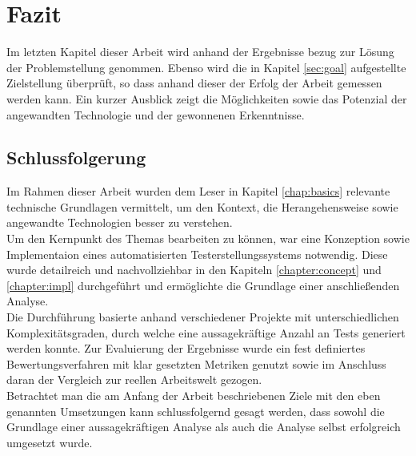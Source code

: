 \chapter{Fazit}
Im letzten Kapitel dieser Arbeit wird anhand der Ergebnisse bezug zur Lösung der Problemstellung genommen. Ebenso wird die in Kapitel \ref{sec:goal} aufgestellte Zielstellung überprüft, so dass anhand dieser der Erfolg der Arbeit gemessen werden kann. Ein kurzer Ausblick zeigt die Möglichkeiten sowie das Potenzial der angewandten Technologie und der gewonnenen Erkenntnisse.

\section{Schlussfolgerung}
Im Rahmen dieser Arbeit wurden dem Leser in Kapitel \ref{chap:basics} relevante technische Grundlagen vermittelt, um den Kontext, die Herangehensweise sowie angewandte Technologien besser zu verstehen.\\ Um den Kernpunkt des Themas bearbeiten zu können, war eine Konzeption sowie Implementaion eines automatisierten Testerstellungssystems notwendig. Diese wurde detailreich und nachvollziehbar in den Kapiteln \ref{chapter:concept} und \ref{chapter:impl} durchgeführt und ermöglichte die Grundlage einer anschließenden Analyse.\\ Die Durchführung basierte anhand verschiedener Projekte mit unterschiedlichen Komplexitätsgraden, durch welche eine aussagekräftige Anzahl an Tests generiert werden konnte. Zur Evaluierung der Ergebnisse wurde ein fest definiertes Bewertungsverfahren mit klar gesetzten Metriken genutzt sowie im Anschluss daran der Vergleich zur reellen Arbeitswelt gezogen.\\ Betrachtet man die am Anfang der Arbeit beschriebenen Ziele mit den eben genannten Umsetzungen kann schlussfolgernd gesagt werden, dass sowohl die Grundlage einer aussagekräftigen Analyse als auch die Analyse selbst erfolgreich umgesetzt wurde.\\\\

